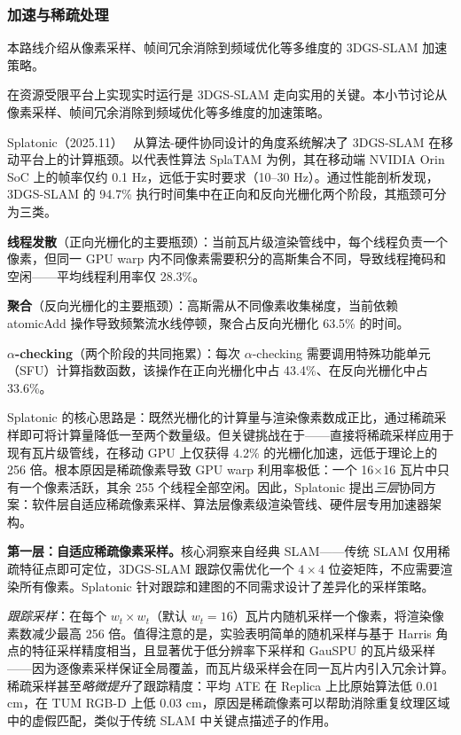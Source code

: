 \subsubsection{加速与稀疏处理}

本路线介绍从像素采样、帧间冗余消除到频域优化等多维度的 3DGS-SLAM 加速策略。

在资源受限平台上实现实时运行是 3DGS-SLAM 走向实用的关键。本小节讨论从像素采样、帧间冗余消除到频域优化等多维度的加速策略。

Splatonic（2025.11）~\cite{2511_18755} 从算法-硬件协同设计的角度系统解决了 3DGS-SLAM 在移动平台上的计算瓶颈。以代表性算法 SplaTAM 为例，其在移动端 NVIDIA Orin SoC 上的帧率仅约 0.1 Hz，远低于实时要求（10--30 Hz）。通过性能剖析发现，3DGS-SLAM 的 94.7\% 执行时间集中在正向和反向光栅化两个阶段，其瓶颈可分为三类。

\textbf{线程发散}（正向光栅化的主要瓶颈）：当前瓦片级渲染管线中，每个线程负责一个像素，但同一 GPU warp 内不同像素需要积分的高斯集合不同，导致线程掩码和空闲——平均线程利用率仅 28.3\%。

\textbf{聚合}（反向光栅化的主要瓶颈）：高斯需从不同像素收集梯度，当前依赖 atomicAdd 操作导致频繁流水线停顿，聚合占反向光栅化 63.5\% 的时间。

\textbf{$\alpha$-checking}（两个阶段的共同拖累）：每次 $\alpha$-checking 需要调用特殊功能单元（SFU）计算指数函数，该操作在正向光栅化中占 43.4\%、在反向光栅化中占 33.6\%。

Splatonic 的核心思路是：既然光栅化的计算量与渲染像素数成正比，通过稀疏采样即可将计算量降低一至两个数量级。但关键挑战在于——直接将稀疏采样应用于现有瓦片级管线，在移动 GPU 上仅获得 4.2\% 的光栅化加速，远低于理论上的 256 倍。根本原因是稀疏像素导致 GPU warp 利用率极低：一个 16$\times$16 瓦片中只有一个像素活跃，其余 255 个线程全部空闲。因此，Splatonic 提出\emph{三层}协同方案：软件层自适应稀疏像素采样、算法层像素级渲染管线、硬件层专用加速器架构。

\textbf{第一层：自适应稀疏像素采样。}核心洞察来自经典 SLAM——传统 SLAM 仅用稀疏特征点即可定位，3DGS-SLAM 跟踪仅需优化一个 $4 \times 4$ 位姿矩阵，不应需要渲染所有像素。Splatonic 针对跟踪和建图的不同需求设计了差异化的采样策略。

\emph{跟踪采样}：在每个 $w_t \times w_t$（默认 $w_t=16$）瓦片内随机采样一个像素，将渲染像素数减少最高 256 倍。值得注意的是，实验表明简单的随机采样与基于 Harris 角点的特征采样精度相当，且显著优于低分辨率下采样和 GauSPU 的瓦片级采样——因为逐像素采样保证全局覆盖，而瓦片级采样会在同一瓦片内引入冗余计算。稀疏采样甚至\emph{略微提升}了跟踪精度：平均 ATE 在 Replica 上比原始算法低 0.01 cm，在 TUM RGB-D 上低 0.03 cm，原因是稀疏像素可以帮助消除重复纹理区域中的虚假匹配，类似于传统 SLAM 中关键点描述子的作用。

